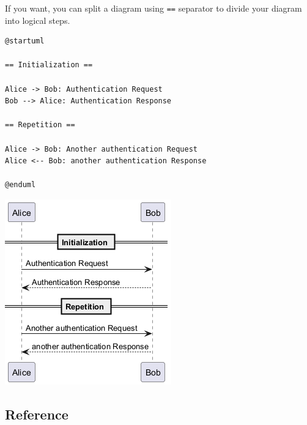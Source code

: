 If you want, you can split a diagram using \texttt{==} separator to
divide your diagram into logical steps.
\begin{verbatim}
@startuml

== Initialization ==

Alice -> Bob: Authentication Request
Bob --> Alice: Authentication Response

== Repetition ==

Alice -> Bob: Another authentication Request
Alice <-- Bob: another authentication Response

@enduml
\end{verbatim}
\begin{center}
\includegraphics[scale=0.60]{imgw/img-489093ed38f02901819aa16c789e1c5e.png}
\end{center}
%
%
\subsection{Reference}


